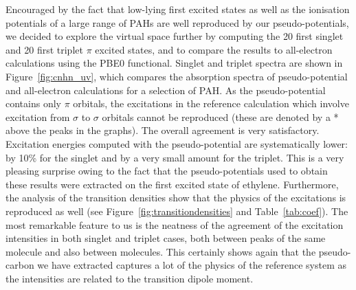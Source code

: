 \documentclass[12pt]{article}
\begin{document}
Encouraged by the fact that low-lying first excited states as well as the ionisation potentials of a large range of PAHs are 
well reproduced by our pseudo-potentials,
we decided to explore the virtual space further by computing the 20 first singlet and 20 first triplet 
$\pi$ excited states, and to compare the results to all-electron calculations using the PBE0 functional.
Singlet and triplet spectra are shown in Figure~\ref{fig:cnhn_uv}, which compares the absorption spectra of pseudo-potential and all-electron calculations for a selection of PAH.
As the pseudo-potential contains only $\pi$ orbitals, the excitations in the reference
calculation which involve excitation from $\sigma$ to $\sigma$ orbitals cannot be reproduced 
(these are denoted by a * above the peaks in the graphs).
The overall agreement is very satisfactory.
Excitation energies computed with the pseudo-potential are systematically lower: by 10\%
for the singlet and by a very small amount for the triplet.
This is a very pleasing surprise owing to the fact that the pseudo-potentials used
to obtain these results were extracted on the first excited state of ethylene.
Furthermore, the analysis of the transition densities show that the physics of the excitations
is reproduced as well (see Figure~\ref{fig:transitiondensities} and Table~\ref{tab:coef}).
The most remarkable feature to us is the neatness of the agreement of the excitation intensities in both singlet and triplet cases, both between peaks of the same molecule and also between molecules.
This certainly shows again that the pseudo-carbon we have extracted captures a lot of the physics of the reference system as the intensities are related to the transition dipole moment.

 
\end{document}
